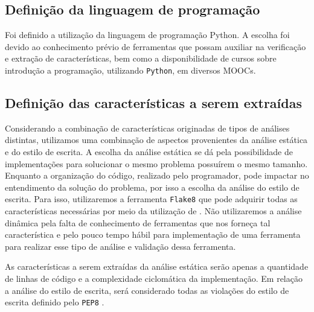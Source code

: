 		\subsection{Definição da linguagem de programação}
			Foi definido a utilização da linguagem de programação Python. A escolha foi
			devido ao conhecimento prévio de ferramentas que possam auxiliar na verificação
			e extração de características, bem como a disponibilidade de cursos sobre
			introdução a programação, utilizando \texttt{Python}, em diversos \acs{MOOC}s.

		\subsection{Definição das características a serem extraídas}
			Considerando a combinação de características originadas de tipos de análises
			distintas, utilizamos uma combinação de aspectos provenientes da análise  %
			estática e do estilo de escrita. A escolha da análise estática se dá pela
			possibilidade de implementações para solucionar o mesmo problema possuírem
			o mesmo tamanho. Enquanto a organização do código, realizado pelo programador,
			pode impactar no entendimento da solução do problema, por isso a escolha da
			análise do estilo de escrita. Para isso, utilizaremos a ferramenta \texttt{Flake8}
			\cite{flake8} que pode adquirir todas as características necessárias por meio da
			utilização de . Não utilizaremos a análise dinâmica pela falta
			de conhecimento de ferramentas que nos forneça tal característica e pelo pouco
			tempo hábil para implementação de uma ferramenta para realizar esse tipo de
			análise e validação dessa ferramenta.
			
			As características a serem extraídas da análise estática serão apenas a quantidade
			de linhas de código e a complexidade ciclomática da implementação. Em relação
			a análise do estilo de escrita, será considerado todas as violações do estilo de
			escrita definido pelo \texttt{PEP8} \cite{van2001pep}. 

